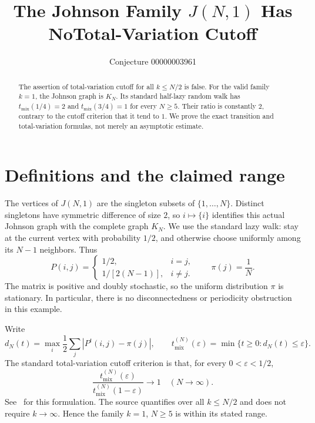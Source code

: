 \documentclass[11pt]{article}
\title{The Johnson Family $J(N,1)$ Has No\newline Total-Variation Cutoff}
\author{Conjecture 00000003961}
\date{}
\newcommand{\tmix}{t_{\mathrm{mix}}}
\begin{document}
\maketitle
\begin{abstract}
The assertion of total-variation cutoff for all $k\leq N/2$ is false. For the valid family $k=1$, the Johnson graph is $K_N$. Its standard half-lazy random walk has $\tmix(1/4)=2$ and $\tmix(3/4)=1$ for every $N\geq5$. Their ratio is constantly $2$, contrary to the cutoff criterion that it tend to $1$. We prove the exact transition and total-variation formulas, not merely an asymptotic estimate.
\end{abstract}

\section*{Definitions and the claimed range}
The vertices of $J(N,1)$ are the singleton subsets of $\{1,\ldots,N\}$. Distinct singletons have symmetric difference of size $2$, so $i\mapsto\{i\}$ identifies this actual Johnson graph with the complete graph $K_N$. We use the standard lazy walk: stay at the current vertex with probability $1/2$, and otherwise choose uniformly among its $N-1$ neighbors. Thus
\[
 P(i,j)=\begin{cases}1/2,&i=j,\\[2pt]1/[2(N-1)],&i\ne j.\end{cases}
 \qquad \pi(j)=\frac1N.
\]
The matrix is positive and doubly stochastic, so the uniform distribution $\pi$ is stationary. In particular, there is no disconnectedness or periodicity obstruction in this example.

Write
\[
 d_N(t)=\max_i\frac12\sum_j|P^t(i,j)-\pi(j)|,
 \qquad \tmix^{(N)}(\varepsilon)=\min\{t\geq0:d_N(t)\leq\varepsilon\}.
\]
The standard total-variation cutoff criterion is that, for every $0<\varepsilon<1/2$,
\begin{equation}\label{eq:cutoff}
 \frac{\tmix^{(N)}(\varepsilon)}{\tmix^{(N)}(1-\varepsilon)}\longrightarrow1
 \quad (N\longrightarrow\infty).
\end{equation}
See~\cite{HermonPeres} for this formulation. The source quantifies over all $k\leq N/2$ and does not require $k\to\infty$. Hence the family $k=1$, $N\geq5$ is within its stated range.
\end{document}
